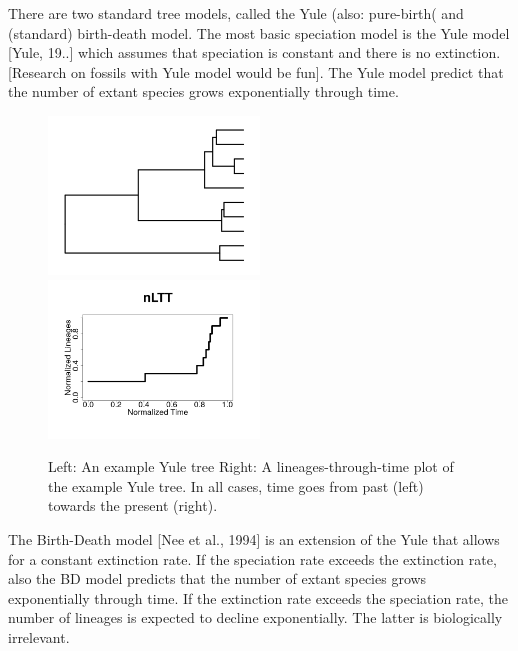 There are two standard tree models, called the Yule (also: pure-birth(
and (standard) birth-death model. The most basic speciation model
is the Yule model [Yule, 19..] which assumes that speciation
is constant and there is no extinction.
[Research on fossils with Yule model would be fun].
The Yule model predict that the number of extant species
grows exponentially through time.

\begin{figure}[H]
  \includegraphics[width=0.5\textwidth]{yule_tree.png}
  \includegraphics[width=0.5\textwidth]{yule_tree_nltt.png}
  \caption{
    Left: An example Yule tree
    Right: A lineages-through-time plot of the example Yule tree.
    In all cases, time goes from past (left) towards the present (right).
  }
  \label{fig:yule}
\end{figure}

The Birth-Death model [Nee et al., 1994] is an extension of the
Yule that allows for a constant extinction rate. 
If the speciation rate exceeds the extinction rate,
also the BD model predicts that the number of extant species
grows exponentially through time. If the extinction rate exceeds
the speciation rate, the number of lineages is expected to decline
exponentially. The latter is biologically irrelevant.

